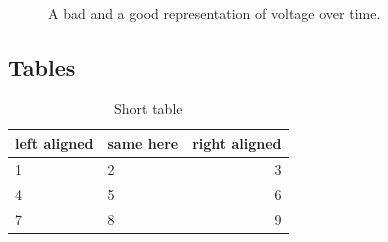 \begin{figure}[t]%
	\centering
	\\%
	\caption{A bad and a good representation of voltage over time.}%
	\label{fig:figures}%
\end{figure}

\subsection{Tables}

\begin{table}
	\centering
	\caption{Short table}
	\label{tab:shorttable}
	\begin{tabular}{llr}
		\toprule
		left aligned & same here & right aligned \\
		\midrule
		1 & 2 & 3 \\
		4 & 5 & 6 \\
		7 & 8 & 9 \\
		\bottomrule
	\end{tabular}
\end{table}

